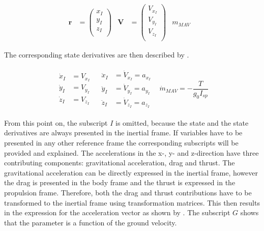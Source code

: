 \begin{align} \label{eq:state}
\mathbf{r}&=\begin{pmatrix}
x_{I}\\
y_{I}\\
z_{I}\\
\end{pmatrix}
&
\mathbf{V}&=\begin{pmatrix}
V_{x_{I}} \\
V_{y_{I}} \\
V_{z_{I}}\\
\end{pmatrix}
&
m_{MAV}&
\end{align}

The corresponding state derivatives are then described by .

\begin{align} \label{eq:state_derivatives}
\begin{split} 
\dot{x}_{I}&=V_{x_{I}}\\
\dot{y}_{I}&=V_{y_{I}}\\
\dot{z}_{I}&=V_{z_{I}}
\end{split} 
&
\begin{split}
\ddot{x}_{I}&=\dot{V}_{x_{I}}=a_{x_{I}}\\
\ddot{y}_{I}&=\dot{V}_{y_{I}}=a_{y_{I}}\\
\ddot{z}_{I}&=\dot{V}_{z_{I}}=a_{z_{I}}
\end{split}
&
\dot{m}_{MAV}=-\dfrac{T}{g_{0}I_{sp}}
\end{align}

From this point on, the subscript $I$ is omitted, because the state and the state derivatives are always presented in the inertial frame. If variables have to be presented in any other reference frame the corresponding subscripts will be provided and explained. The accelerations in the x-, y- and z-direction have three contributing components: gravitational acceleration, drag and thrust. The gravitational acceleration can be directly expressed in the inertial frame, however the drag is presented in the body frame and the thrust is expressed in the propulsion frame. Therefore, both the drag and thrust contributions have to be transformed to the inertial frame using transformation matrices. This then results in the expression for the acceleration vector as shown by . The subscript $G$ shows that the parameter is a function of the ground velocity.

